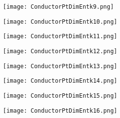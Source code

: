 \documentclass[pdf]{beamer}
\begin{document}
\begin{frame}
\begin{figure}[!h]
\centering
\texttt{[image: ConductorPtDimEntk9.png]}
\end{figure}
\end{frame}

\begin{frame}
\begin{figure}[!h]
\centering
\texttt{[image: ConductorPtDimEntk10.png]}
\end{figure}
\end{frame}

\begin{frame}
\begin{figure}[!h]
\centering
\texttt{[image: ConductorPtDimEntk11.png]}
\end{figure}
\end{frame}

\begin{frame}
\begin{figure}[!h]
\centering
\texttt{[image: ConductorPtDimEntk12.png]}
\end{figure}
\end{frame}

\begin{frame}
\begin{figure}[!h]
\centering
\texttt{[image: ConductorPtDimEntk13.png]}
\end{figure}
\end{frame}

\begin{frame}
\begin{figure}[!h]
\centering
\texttt{[image: ConductorPtDimEntk14.png]}
\end{figure}
\end{frame}

\begin{frame}
\begin{figure}[!h]
\centering
\texttt{[image: ConductorPtDimEntk15.png]}
\end{figure}
\end{frame}

\begin{frame}
\begin{figure}[!h]
\centering
\texttt{[image: ConductorPtDimEntk16.png]}
\end{figure}
\end{frame}
\end{document}
